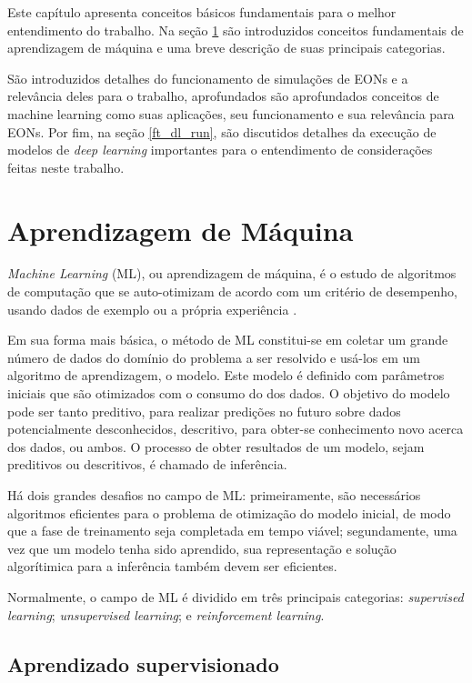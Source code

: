 Este capítulo apresenta conceitos básicos fundamentais para o melhor entendimento do trabalho. Na seção \ref{ml} são introduzidos conceitos fundamentais de aprendizagem de máquina e uma breve descrição de suas principais categorias.

São introduzidos detalhes do funcionamento de simulações de EONs e a relevância deles para o trabalho, aprofundados são aprofundados conceitos de machine learning como suas aplicações, seu funcionamento e sua relevância para EONs. Por fim, na seção \ref{ft_dl_run}, são discutidos detalhes da execução de modelos de \textit{deep learning} importantes para o entendimento de considerações feitas neste trabalho.

\section{Aprendizagem de Máquina}
\label{ml}

\textit{Machine Learning} (ML), ou aprendizagem de máquina, é o estudo de algoritmos de computação que se auto-otimizam de acordo com um critério de desempenho, usando dados de exemplo ou a própria experiência \cite{mitchell1997ml, alpaydin2020introduction}.

Em sua forma mais básica, o método de ML constitui-se em coletar um grande número de dados do domínio do problema a ser resolvido e usá-los em um algoritmo de aprendizagem, o modelo. Este modelo é definido com parâmetros iniciais que são otimizados com o consumo do dos dados. O objetivo do modelo pode ser tanto preditivo, para realizar predições no futuro sobre dados potencialmente desconhecidos, descritivo, para obter-se conhecimento novo acerca dos dados, ou ambos. O processo de obter resultados de um modelo, sejam preditivos ou descritivos, é chamado de inferência.

Há dois grandes desafios no campo de ML: primeiramente, são necessários algoritmos eficientes para o problema de otimização do modelo inicial, de modo que a fase de treinamento seja completada em tempo viável; segundamente, uma vez que um modelo tenha sido aprendido, sua representação e solução algorítimica para a inferência também devem ser eficientes. \cite{alpaydin2020introduction} \cite{brief_introduction_to_ml}

Normalmente, o campo de ML é dividido em três principais categorias: \textit{supervised learning}; \textit{unsupervised learning}; e \textit{reinforcement learning}.

\subsection{Aprendizado supervisionado}

